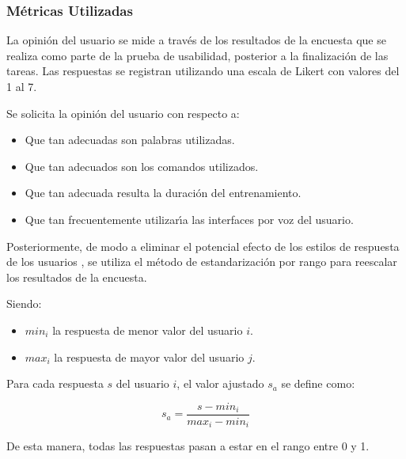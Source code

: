 \subsubsection{M\'etricas Utilizadas}
La opini\'on del usuario se mide a trav\'es de los resultados de la encuesta que se realiza como parte de
la prueba de usabilidad, posterior a la finalizaci\'on de las tareas. Las respuestas se
registran utilizando una escala de Likert \cite{Allen:2007} con valores del 1 al 7.

Se solicita la opini\'on del usuario con respecto a:
\begin{itemize}
	\item Que tan adecuadas son palabras utilizadas.
	\item Que tan adecuados son los comandos utilizados.
	\item Que tan adecuada resulta la duraci\'on del entrenamiento.
	\item Que tan frecuentemente utilizar{\'\i}a las interfaces por voz del usuario.
\end{itemize}

Posteriormente, de modo a eliminar el potencial efecto de los estilos de respuesta
de los usuarios \cite{Fischer2010}, se utiliza el m\'etodo de estandarizaci\'on 
por rango \cite{Pagolu2011} para reescalar los resultados de la encuesta.

Siendo:
\begin{itemize}
	\item $min_i$ la respuesta de menor valor del usuario $i$.
	\item $max_i$ la respuesta de mayor valor del usuario $j$.
\end{itemize}

Para cada respuesta $s$ del usuario $i$, el valor ajustado $s_a$ se define como:

\begin{equation*}
s_a=\frac{s-min_i}{max_i-min_i}
\end{equation*}


De esta manera, todas las respuestas pasan a estar en el rango entre 0 y 1.  




